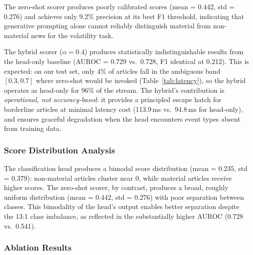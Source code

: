 \documentclass{article}
\begin{document}
The zero-shot scorer produces poorly calibrated scores (mean = 0.442, std = 0.276) and achieves only 9.2\% precision at its best F1 threshold, indicating that generative prompting alone cannot reliably distinguish material from non-material news for the volatility task.

The hybrid scorer ($\alpha = 0.4$) produces statistically indistinguishable results from the head-only baseline (AUROC = 0.729 vs.\ 0.728, F1 identical at 0.212).
This is expected: on our test set, only 4\% of articles fall in the ambiguous band $[0.3, 0.7]$ where zero-shot would be invoked (Table~\ref{tab:latency}), so the hybrid operates as head-only for 96\% of the stream.
The hybrid's contribution is \emph{operational, not accuracy-based}: it provides a principled escape hatch for borderline articles at minimal latency cost (113.9\,ms vs.\ 94.8\,ms for head-only), and ensures graceful degradation when the head encounters event types absent from training data.

\subsubsection{Score Distribution Analysis}

The classification head produces a bimodal score distribution (mean = 0.235, std = 0.379): non-material articles cluster near 0, while material articles receive higher scores.
The zero-shot scorer, by contrast, produces a broad, roughly uniform distribution (mean = 0.442, std = 0.276) with poor separation between classes.
This bimodality of the head's output enables better separation despite the 13:1 class imbalance, as reflected in the substantially higher AUROC (0.728 vs.\ 0.541).

\subsubsection{Ablation Results}
\end{document}
